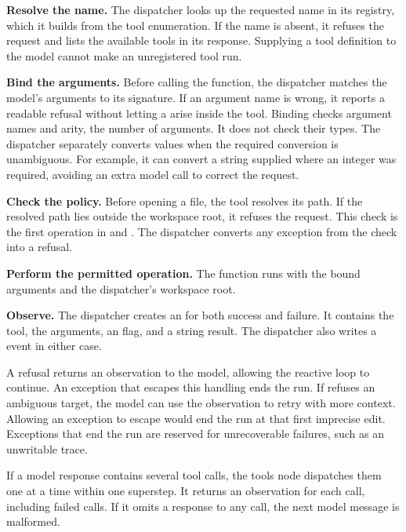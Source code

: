 \bi

\item \textbf{Resolve the name.} The dispatcher looks up the requested name in its registry,
which it builds from the tool enumeration. If the name is absent, it refuses the request and
lists the available tools in its response. Supplying a tool definition to the model cannot make
an unregistered tool run.

\item \textbf{Bind the arguments.} Before calling the function, the dispatcher matches the model's
arguments to its signature. If an argument name is wrong, it reports a readable refusal without
letting a  arise inside the tool. Binding checks argument names and arity, the
number of arguments. It does not check their types. The dispatcher separately converts values
when the required conversion is unambiguous. For example, it can convert a string supplied where
an integer was required, avoiding an extra model call to correct the request.

\item \textbf{Check the policy.} Before opening a file, the tool resolves its path. If the resolved
path lies outside the workspace root, it refuses the request. This check is the first operation
in  and . The dispatcher converts any exception from the check
into a refusal.

\item \textbf{Perform the permitted operation.} The function runs with the bound arguments and the
dispatcher's workspace root.

\item \textbf{Observe.} The dispatcher creates an  for both success and
failure. It contains the tool, the arguments, an  flag, and a string result. The
dispatcher also writes a  event in either case.

\ei

A refusal returns an observation to the model, allowing the reactive loop to continue. An
exception that escapes this handling ends the run. If  refuses an ambiguous target,
the model can use the observation to retry with more context. Allowing an exception to escape
would end the run at that first imprecise edit. Exceptions that end the run are reserved for
unrecoverable failures, such as an unwritable trace.

If a model response contains several tool calls, the tools node dispatches them one at a time
within one superstep. It returns an observation for each call, including failed calls. If it
omits a response to any call, the next model message is malformed.

